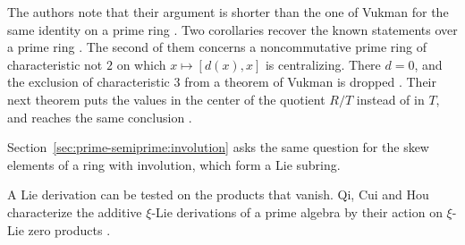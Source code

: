 The authors note that their argument is shorter than the one of Vukman for the same
identity on a prime ring \cite[p.~2]{SandhuRehman2025}. Two corollaries recover the
known statements over a prime ring \cite[p.~4]{SandhuRehman2025}. The second of
them concerns a noncommutative prime ring of characteristic not $2$ on which
$x\mapsto[d(x),x]$ is centralizing. There $d=0$, and the exclusion of
characteristic $3$ from a theorem of Vukman is dropped
\cite[Corollary~2.7, p.~6]{SandhuRehman2025}. Their next theorem puts the values in
the center of the quotient $R/T$ instead of in $T$, and reaches the same conclusion
\cite[Theorem~2.5, p.~5]{SandhuRehman2025}.

Section~\ref{sec:prime-semiprime:involution} asks the same question for the skew
elements of a ring with involution, which form a Lie subring.

A Lie derivation can be tested on the products that vanish. Qi, Cui and Hou
characterize the additive $\xi$-Lie derivations of a prime algebra by their
action on $\xi$-Lie zero products \cite[pp.~669--682]{QiCuiHou2011XiLie}.

